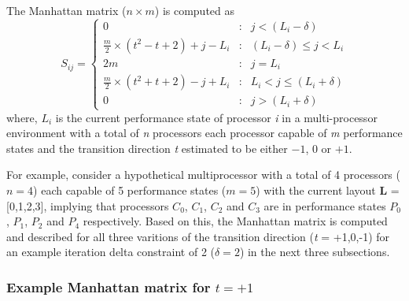 The Manhattan matrix ($n \times m$) is computed as
\begin{equation}
    S_{ij} = \left\{
     \begin{array}{lcr}
       0 & : & j < (L_{i} - \delta) \\
       \frac{m}{2} \times (t^{2} - t + 2) + j - L_{i} & : & (L_{i} - \delta) \leq j < L_{i} \\
       2m & : & j = L_{i}\\
       \frac{m}{2} \times (t^{2} + t + 2) - j + L_{i} & : & L_{i} < j \leq (L_{i} + \delta) \\
       0 & : & j > (L_{i} + \delta)
     \end{array}
   \right.
\label{eq:delta_mat}
\end{equation}
where, $L_i$ is the current performance state of processor \textit{i} in a multi-processor environment 
with a total of \textit{n} processors each processor capable of \textit{m} performance states 
and the transition direction \textit{t} estimated to be either $-1$, $0$ or $+1$. 

For example, consider a hypothetical multiprocessor with a total of 4 processors ($n = 4$) each capable of
5 performance states ($m = 5$) with the current layout \textbf{L} = [0,1,2,3], implying that processors $C_0$, $C_1$, $C_2$ and $C_3$
are in performance states $P_0$, $P_1$, $P_2$ and $P_4$ respectively. Based on this, the Manhattan matrix 
is computed and described for all three varitions of the transition direction (\textit{t} = +1,0,-1) for an example iteration 
delta constraint of 2 ($\delta = 2$) in the next three subsections. 


\subsubsection{Example Manhattan matrix for $t = +1$}~\label{sec:delta_matrix_h}

